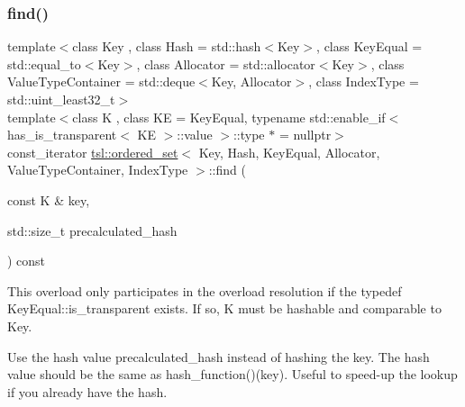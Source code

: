 \subsubsection{\texorpdfstring{find()}{find()}\hspace{0.1cm}{\footnotesize\ttfamily [6/6]}}
{\footnotesize\ttfamily template$<$class Key , class Hash  = std\+::hash$<$\+Key$>$, class Key\+Equal  = std\+::equal\+\_\+to$<$\+Key$>$, class Allocator  = std\+::allocator$<$\+Key$>$, class Value\+Type\+Container  = std\+::deque$<$\+Key, Allocator$>$, class Index\+Type  = std\+::uint\+\_\+least32\+\_\+t$>$ \\
template$<$class K , class KE  = Key\+Equal, typename std\+::enable\+\_\+if$<$ has\+\_\+is\+\_\+transparent$<$ K\+E $>$\+::value $>$\+::type $\ast$  = nullptr$>$ \\
const\+\_\+iterator \mbox{\hyperlink{classtsl_1_1ordered__set}{tsl\+::ordered\+\_\+set}}$<$ Key, Hash, Key\+Equal, Allocator, Value\+Type\+Container, Index\+Type $>$\+::find (\begin{DoxyParamCaption}\item[{const K \&}]{key,  }\item[{std\+::size\+\_\+t}]{precalculated\+\_\+hash }\end{DoxyParamCaption}) const\hspace{0.3cm}{\ttfamily [inline]}}





This overload only participates in the overload resolution if the typedef Key\+Equal\+::is\+\_\+transparent exists. If so, K must be hashable and comparable to Key.

Use the hash value \textquotesingle{}precalculated\+\_\+hash\textquotesingle{} instead of hashing the key. The hash value should be the same as hash\+\_\+function()(key). Useful to speed-\/up the lookup if you already have the hash. \mbox{\label{classtsl_1_1ordered__set_a6601e0f32a8a36628753bfcbc096be0f}} 
